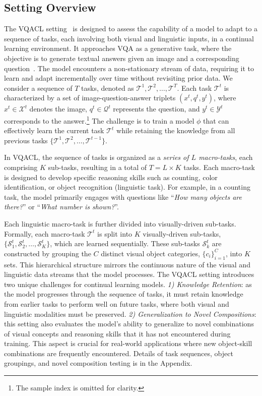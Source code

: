 \subsection{Setting Overview}
\label{sec:setting}
The VQACL setting~\citep{zhang2023vqacl} is designed to assess the capability of a model to adapt to a sequence of tasks, each involving both visual and linguistic inputs, in a continual learning environment. It approaches VQA as a generative task, where the objective is to generate textual answers given an image and a corresponding question~\citep{ghosh2024exploringfrontiervisionlanguagemodels, zhang2023vqacl}. The model encounters a non-stationary stream of data, requiring it to learn and adapt incrementally over time without revisiting prior data. We consider a sequence of $T$ tasks, denoted as $ \mathcal{T}^1, \mathcal{T}^2, \ldots, \mathcal{T}^T$. Each task $\mathcal{T}^t$ is characterized by a set of image-question-answer triplets $(x^t, q^t, y^t)$, where $x^t \in \mathcal{X}^t$ denotes the image, $q^t \in \mathcal{Q}^t$ represents the question, and $y^t \in \mathcal{Y}^t$ corresponds to the answer.\footnote{The sample index is omitted for clarity.} The challenge is to train a model $\phi$ that can effectively learn the current task $\mathcal{T}^t$ while retaining the knowledge from all previous tasks $\{\mathcal{T}^1, \mathcal{T}^2, \ldots, \mathcal{T}^{t-1}\}$. 

In VQACL, the sequence of tasks is organized as a \emph{series of \( L \) macro-tasks}, each comprising \( K \) sub-tasks, resulting in a total of \( T = L \times K \) tasks. Each macro-task is designed to develop specific reasoning skills such as counting, color identification, or object recognition (\ie linguistic task). For example, in a counting task, the model primarily engages with questions like ``\textit{How many objects are there?}'' or ``\textit{What number is shown?}''.

Each linguistic macro-task is further divided into visually-driven sub-tasks. Formally, each macro-task \( \mathcal{T}^t \) is split into \( K \) visually-driven sub-tasks, \( \{\mathcal{S}^t_1, \mathcal{S}^t_2, \ldots, \mathcal{S}^t_K\} \), which are learned sequentially. These sub-tasks \( \mathcal{S}^t_k \) are constructed by grouping the \( C \) distinct visual object categories, \( \{c_i\}_{i=1}^C \), into \( K \) sets. This hierarchical structure mirrors the continuous nature of the visual and linguistic data streams that the model processes. 
The VQACL setting introduces two unique challenges for continual learning models. \textit{1) Knowledge Retention}: as the model progresses through the sequence of tasks, it must retain knowledge from earlier tasks to perform well on future tasks, where both visual and linguistic modalities must be preserved. \textit{2) Generalization to Novel Compositions}: this setting also evaluates the model's ability to generalize to novel combinations of visual concepts and reasoning skills that it has not encountered during training. This aspect is crucial for real-world applications where new object-skill combinations are frequently encountered. Details of task sequences, object groupings, and novel composition testing is in the Appendix.
